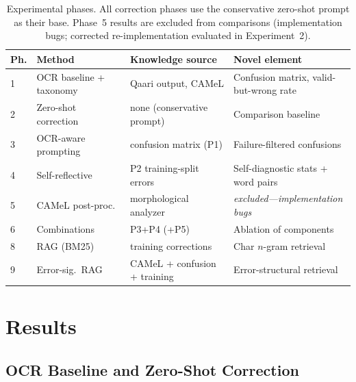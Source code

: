 \documentclass[conference]{IEEEtran}
\begin{document}
\begin{table}[t]
\caption{Experimental phases. All correction phases use the conservative
zero-shot prompt as their base. Phase~5 results are excluded from comparisons
(implementation bugs; corrected re-implementation evaluated in Experiment~2).}
\label{tab:methodology}
\begin{center}
\footnotesize
\setlength{\tabcolsep}{4pt}%
\begin{tabular}{p{}p{}p{}p{}}
\toprule
\textbf{Ph.} & \textbf{Method} & \textbf{Knowledge source} & \textbf{Novel element} \\
\midrule
1 & OCR baseline + taxonomy & Qaari output, CAMeL & Confusion matrix, valid-but-wrong rate \\
2 & Zero-shot correction & none (conservative prompt) & Comparison baseline \\
3 & OCR-aware prompting & confusion matrix (P1) & Failure-filtered confusions \\
4 & Self-reflective & P2 training-split errors & Self-diagnostic stats + word pairs \\
5 & CAMeL post-proc. & morphological analyzer & \emph{excluded---implementation bugs} \\
6 & Combinations & P3+P4 (+P5) & Ablation of components \\
8 & RAG (BM25) & training corrections & Char $n$-gram retrieval \\
9 & Error-sig.\ RAG & CAMeL + confusion + training & Error-structural retrieval \\
\bottomrule
\end{tabular}
\end{center}
\end{table}

\section{Results}

\subsection{OCR Baseline and Zero-Shot Correction}
\end{document}
